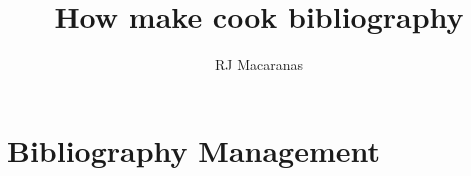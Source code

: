 \documentclass{article}
\author{RJ Macaranas}
\title{How make cook bibliography}
\begin{document}
\maketitle

\section{Bibliography Management}
\end{document}
